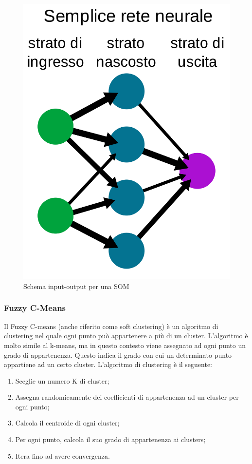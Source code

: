 \begin{figure}[h!]
	\centering
	\includegraphics[width=1\textwidth]{images/example_som.png}
	\caption{Schema input-output per una SOM}
\end{figure}
\subsubsection{Fuzzy C-Means}
Il Fuzzy C-means (anche riferito come soft clustering) è un algoritmo di clustering nel quale ogni punto può appartenere a più di un cluster. L'algoritmo è molto simile al k-means, ma in questo contesto viene assegnato ad ogni punto un grado di appartenenza. Questo indica il grado con cui un determinato punto appartiene ad un certo cluster. L'algoritmo di clustering è il seguente:
\begin{enumerate}
	\item Sceglie un numero K di cluster;
	\item Assegna randomicamente dei coefficienti di appartenenza ad un cluster per ogni punto;
	\item Calcola il centroide di ogni cluster;
	\item Per ogni punto, calcola il suo grado di appartenenza ai clusters;
	\item Itera fino ad avere convergenza.
\end{enumerate}


